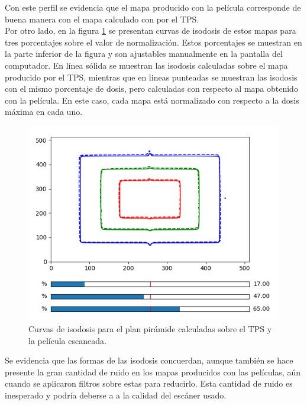 Con este perfil se evidencia que el mapa producido con la película corresponde de buena manera con el mapa calculado con por el TPS.\\

Por otro lado, en la figura \ref{fig:isodosisPiramide}  se presentan curvas de isodosis de estos mapas para tres porcentajes sobre el valor de normalización. Estos porcentajes se muestran en la parte inferior de la figura y son ajustables manualmente en la pantalla del computador. En línea sólida se muestran las isodosis calculadas sobre el mapa producido por el TPS, mientras que en lineas punteadas se muestran las isodosis con el mismo porcentaje de dosis, pero calculadas con respecto al mapa obtenido con la película. En este caso, cada mapa está normalizado con respecto a la dosis máxima en cada uno. \\ 
\begin{figure}[H]
	\centering
	\includegraphics[width=0.7\linewidth]{images/isodosisPiramide2.png}
	\caption{Curvas de isodosis para el plan pirámide calculadas sobre el TPS y la película escaneada.  }
	\label{fig:isodosisPiramide}
\end{figure}

Se evidencia que las formas de las isodosis concuerdan, aunque también se hace presente la gran cantidad de ruido en los mapas producidos con las películas, aún cuando se aplicaron filtros sobre estas para reducirlo. Esta cantidad de ruido es inesperado y podría deberse a a la calidad del escáner usado. \\

